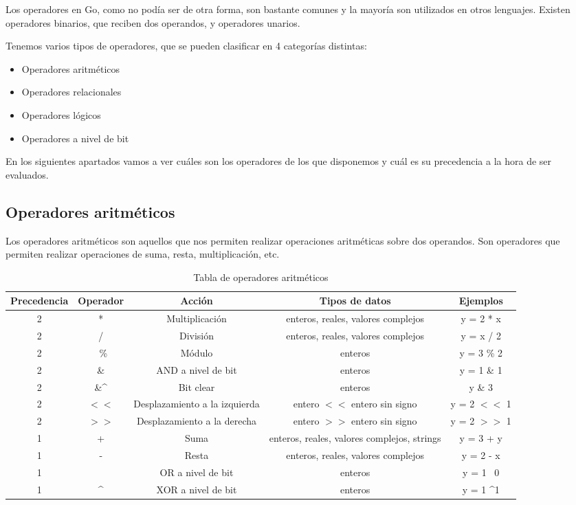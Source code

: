 	Los operadores en Go, como no podía ser de otra forma, son bastante comunes
	y la mayoría son utilizados en otros lenguajes. Existen operadores binarios,
	que reciben dos operandos, y operadores unarios.

	Tenemos varios tipos de operadores, que se pueden clasificar en 4 categorías
	distintas:

	\begin{itemize}
		\item Operadores aritméticos
		\item Operadores relacionales
		\item Operadores lógicos
		\item Operadores a nivel de bit
	\end{itemize}

	En los siguientes apartados vamos a ver cuáles son los operadores de los que
	disponemos y cuál es su precedencia a la hora de ser evaluados.

	\subsection{Operadores aritméticos}

	Los operadores aritméticos son aquellos que nos permiten realizar
	operaciones aritméticas sobre dos operandos. Son operadores que permiten
	realizar operaciones de suma, resta, multiplicación, etc.

	\begin{table}[htb]
		\begin{center}
			\begin{tabular}{ccccc}
				\textbf{Precedencia} & \textbf{Operador} & \textbf{Acción}
				& \textbf{Tipos de datos} & \textbf{Ejemplos}\\
				\hline
				2 & * & Multiplicación & enteros, reales, valores complejos & y = 2 * x\\
				2 & / & División & enteros, reales, valores complejos & y = x / 2\\
				2 & \ \% & Módulo & enteros & y = 3 \% 2\\
				2 & \& & AND a nivel de bit & enteros & y = 1 \& 1\\
				2 & \&\textasciicircum & Bit clear & enteros & y \& 3\\
				2 & $<<$ & Desplazamiento a la izquierda & entero $<<$ entero
				  sin signo & y = 2 $<<$ 1\\
				2 & $>>$ & Desplazamiento a la derecha & entero $>>$ entero sin
				  signo & y = 2 $>>$ 1\\
				1 & + & Suma & enteros, reales, valores complejos, strings & y = 3 + y\\
				1 & - & Resta & enteros, reales, valores complejos & y = 2 - x\\
				1 & \textbar & OR a nivel de bit & enteros & y = 1 \textbar\ 0\\
				1 & \textasciicircum & XOR a nivel de bit & enteros & y = 1 \textasciicircum 1\\
				\hline
			\end{tabular}
		\end{center}
		\caption{Tabla de operadores aritméticos}
		\label{tabopar}
	\end{table}

